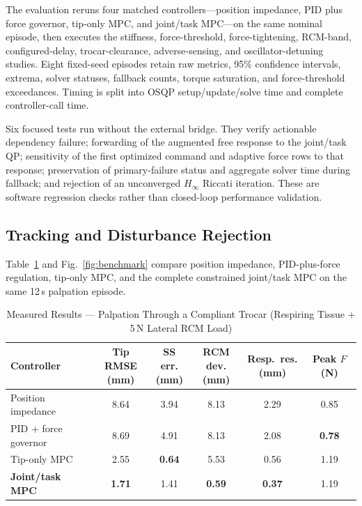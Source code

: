The evaluation reruns four matched controllers---position impedance, PID plus
force governor, tip-only MPC, and joint/task MPC---on the same nominal
episode, then executes the stiffness, force-threshold, force-tightening,
RCM-band, configured-delay, trocar-clearance, adverse-sensing, and
oscillator-detuning studies. Eight fixed-seed episodes retain raw metrics,
95\% confidence intervals, extrema, solver statuses, fallback counts, torque
saturation, and force-threshold exceedances. Timing is split into OSQP
setup/update/solve time and complete controller-call time.

Six focused tests run without the external bridge. They verify actionable dependency
failure; forwarding of the augmented free response to the joint/task QP;
sensitivity of the first optimized command and adaptive force rows to that
response; preservation of primary-failure status and aggregate solver time
during fallback; and rejection of an unconverged $H_\infty$ Riccati iteration.
These are software regression checks rather than closed-loop performance validation.

\subsection{Tracking and Disturbance Rejection}

Table~\ref{tab:results} and Fig.~\ref{fig:benchmark} compare position impedance, PID-plus-force regulation, tip-only MPC, and the complete constrained joint/task MPC on the same 12\,s palpation episode.

\begin{table}[!t]
\caption{Measured Results --- Palpation Through a Compliant Trocar (Respiring Tissue + 5\,N Lateral RCM Load)}
\label{tab:results}
\centering
\footnotesize
\setlength{\tabcolsep}{2.3pt}
\begin{tabular}{lccccc}
\toprule
Controller & \shortstack{Tip RMSE\\(mm)} & \shortstack{SS err.\\(mm)} & \shortstack{RCM dev.\\(mm)} & \shortstack{Resp.\ res.\\(mm)} & \shortstack{Peak $F$\\(N)} \\
\midrule
Position impedance & 8.64 & 3.94 & 8.13 & 2.29 & 0.85 \\
PID + force governor & 8.69 & 4.91 & 8.13 & 2.08 & \textbf{0.78} \\
Tip-only MPC & 2.55 & \textbf{0.64} & 5.53 & 0.56 & 1.19 \\
\textbf{Joint/task MPC} & \textbf{1.71} & 1.41 & \textbf{0.59} & \textbf{0.37} & 1.19 \\
\bottomrule
\end{tabular}
\end{table}

